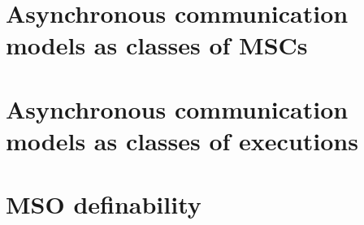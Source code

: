 \documentclass[acmsmall,review,anonymous,screen]{acmart}\settopmatter{printfolios=true,printccs=false,printacmref=true}
\begin{document}
% 




\section{Asynchronous communication models as classes of MSCs}\label{sec:MSC}



\section{Asynchronous communication models as classes of executions}\label{sec:impl}



\section{MSO definability}\label{sec:MSO}




%
\end{document}
